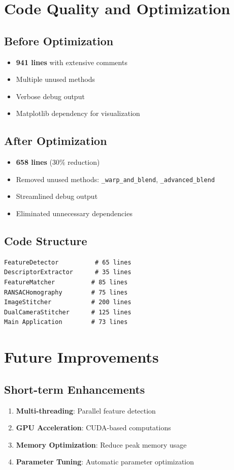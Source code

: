 \documentclass[12pt,a4paper]{article}
\begin{document}
\section{Code Quality and Optimization}

\subsection{Before Optimization}
\begin{itemize}
    \item \textbf{941 lines} with extensive comments
    \item Multiple unused methods
    \item Verbose debug output
    \item Matplotlib dependency for visualization
\end{itemize}

\subsection{After Optimization}  
\begin{itemize}
    \item \textbf{658 lines} (30\% reduction)
    \item Removed unused methods: \texttt{\_warp\_and\_blend}, \texttt{\_advanced\_blend}
    \item Streamlined debug output
    \item Eliminated unnecessary dependencies
\end{itemize}

\subsection{Code Structure}
\begin{lstlisting}[caption=Clean, modular design]
FeatureDetector          # 65 lines
DescriptorExtractor      # 35 lines  
FeatureMatcher          # 85 lines
RANSACHomography        # 75 lines
ImageStitcher           # 200 lines
DualCameraStitcher      # 125 lines
Main Application        # 73 lines
\end{lstlisting}

\section{Future Improvements}

\subsection{Short-term Enhancements}
\begin{enumerate}
    \item \textbf{Multi-threading}: Parallel feature detection
    \item \textbf{GPU Acceleration}: CUDA-based computations
    \item \textbf{Memory Optimization}: Reduce peak memory usage
    \item \textbf{Parameter Tuning}: Automatic parameter optimization
\end{enumerate}
\end{document}
